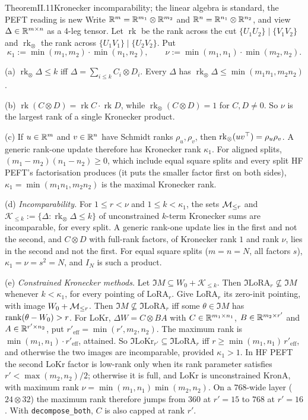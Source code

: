 \begin{restate}{Theorem}{II.11}{Kronecker incomparability; the linear algebra is standard, the PEFT reading is new}
Write $\mathbb{R}^m=\mathbb{R}^{m_1}\otimes\mathbb{R}^{m_2}$ and $\mathbb{R}^n=\mathbb{R}^{n_1}\otimes\mathbb{R}^{n_2}$, and view $\Delta\in\mathbb{R}^{m\times n}$ as a 4-leg
tensor. Let $\operatorname{rk}$ be the rank across the cut $\{U_1U_2\}\mid\{V_1V_2\}$ and $\operatorname{rk}_\otimes$
the rank across $\{U_1V_1\}\mid\{U_2V_2\}$. Put
\begin{equation*}
  \kappa_1:=\min(m_1,m_2)\cdot\min(n_1,n_2),\qquad\nu:=\min(m_1,n_1)\cdot\min(m_2,n_2).
\end{equation*}

(a) $\operatorname{rk}_\otimes\Delta\le k$ iff $\Delta=\sum_{i\le k}C_i\otimes D_i$. Every $\Delta$ has
$\operatorname{rk}_\otimes\Delta\le\min(m_1n_1,m_2n_2)$.

(b) $\operatorname{rk}(C\otimes D)=\operatorname{rk}C\cdot\operatorname{rk}D$, while
$\operatorname{rk}_\otimes(C\otimes D)=1$ for $C,D\ne0$. So $\nu$ is the largest rank of a single Kronecker product.

(c) If $u\in\mathbb{R}^m$ and $v\in\mathbb{R}^n$ have Schmidt ranks $\rho_u,\rho_v$, then
$\operatorname{rk}_\otimes(uv^{\top})=\rho_u\rho_v$. A generic rank-one update therefore has Kronecker rank $\kappa_1$. For
aligned splits, $(m_1-m_2)(n_1-n_2)\ge0$, which include equal square splits and every split HF PEFT's factorisation
produces (it puts the smaller factor first on both sides), $\kappa_1=\min(m_1n_1,m_2n_2)$ is the maximal Kronecker rank.

(d) \emph{Incomparability.} For $1\le r<\nu$ and $1\le k<\kappa_1$, the sets $\mathcal{M}_{\le r}$ and
$\mathcal K_{\le k}:=\{\Delta:\operatorname{rk}_\otimes\Delta\le k\}$ of unconstrained $k$-term Kronecker sums are
incomparable, for every split. A generic rank-one update lies in the first and not the second, and $C\otimes D$ with
full-rank factors, of Kronecker rank $1$ and rank $\nu$, lies in the second and not the first. For equal square splits
($m=n=N$, all factors $s$), $\kappa_1=\nu=s^2=N$, and $I_N$ is such a product.

(e) \emph{Constrained Kronecker methods.} Let $\Im M\subseteq W_0+\mathcal K_{\le k}$. Then
$\Im\mathrm{LoRA}_r\not\subseteq\Im M$ whenever $k<\kappa_1$, for every pointing of $\mathrm{LoRA}_r$. Give
$\mathrm{LoRA}_r$ its zero-init pointing, with image $W_0+\mathcal{M}_{\le r}$. Then $\Im M\not\subseteq\Im\mathrm{LoRA}_r$ iff some
$\theta\in\Im M$ has $\operatorname{rank}(\theta-W_0)>r$. For LoKr, $\Delta W=C\otimes BA$ with $C\in\mathbb{R}^{m_1\times n_1}$,
$B\in\mathbb{R}^{m_2\times r'}$ and $A\in\mathbb{R}^{r'\times n_2}$, put $r'_{\mathrm{eff}}=\min(r',m_2,n_2)$. The maximum rank is
$\min(m_1,n_1)\cdot r'_{\mathrm{eff}}$, attained. So $\Im\mathrm{LoKr}_{r'}\subseteq\Im\mathrm{LoRA}_r$ iff
$r\ge\min(m_1,n_1)\,r'_{\mathrm{eff}}$, and otherwise the two images are incomparable, provided $\kappa_1>1$. In HF PEFT
the second LoKr factor is low-rank only when its rank parameter satisfies $r'<\max(m_2,n_2)/2$; otherwise it is full,
and LoKr is unconstrained KronA, with maximum rank $\nu=\min(m_1,n_1)\min(m_2,n_2)$. On a $768$-wide layer
($24\otimes32$) the maximum rank therefore jumps from $360$ at $r'=15$ to $768$ at $r'=16$. With
\texttt{decompose\_both}, $C$ is also capped at rank $r'$.
\end{restate}
